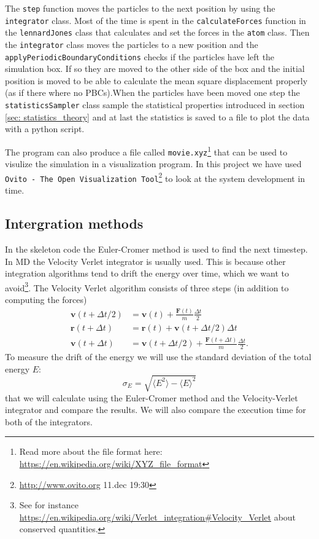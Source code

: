 \documentclass[11pt,a4wide]{article}
\renewcommand{\vec}{\mathbf}
\begin{document}
The \texttt{step} function moves the particles to the next position by using the \texttt{integrator} class. Most of the time is spent in the \texttt{calculateForces} function in the \texttt{lennardJones} class that calculates and set the forces in the \texttt{atom} class. Then the \texttt{integrator} class moves the particles to a new position and the \texttt{applyPeriodicBoundaryConditions} checks if the particles have left the simulation box. If so they are moved to the other side of the box and the initial position is moved to be able to calculate the mean square displacement properly (as if there where no PBCs).When the particles have been moved one step the \texttt{statisticsSampler} class sample the statistical properties introduced in section \ref{sec: statistics_theory} and at last the statistics is saved to a file to plot the data with a python script. 

The program can also produce a file called \texttt{movie.xyz}\footnote{Read more about the file format here: \url{https://en.wikipedia.org/wiki/XYZ\_file\_format}} that can be used to visulize the simulation in a visualization program. In this project we have used \texttt{Ovito - The Open Visualization Tool}\footnote{\url{http://www.ovito.org} 11.dec 19:30} to look at the system development in time.


\subsection{Intergration methods} \label{sec: int_methods}
In the skeleton code the Euler-Cromer method is used to find the next timestep. In MD the Velocity Verlet integrator is usually used. This is because other integration algorithms tend to drift the energy over time, which we want to avoid\footnote{See for instance \url{https://en.wikipedia.org/wiki/Verlet\_integration\#Velocity\_Verlet} about conserved quantities.}. The Velocity Verlet algorithm consists of three steps (in addition to computing the forces)
\begin{align}
	\vec v(t + \Delta t/2) &= \vec v(t) + \frac{\vec F(t)}{m}\frac{\Delta t}{2}\\
	\vec r(t + \Delta t) &= \vec r(t) + \vec v(t + \Delta t/2)\Delta t\\
	\vec v(t + \Delta t) &= \vec v(t + \Delta t/2) + \frac{\vec F(t + \Delta t)}{m}\frac{\Delta t}{2}.
\end{align}
To measure the drift of the energy we will use the standard deviation of the total energy $E$:
\[
\sigma_E = \sqrt{\langle E^2 \rangle - \langle E \rangle^2}
\]
that we will calculate using the Euler-Cromer method and the Velocity-Verlet integrator and compare the results. We will also compare the execution time for both of the integrators.
\end{document}
